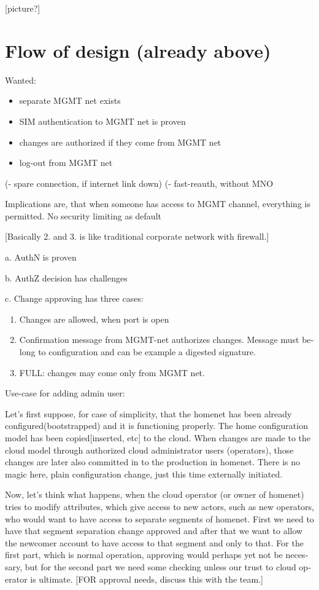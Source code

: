 \documentclass[12pt,a4paper,english]{tutthesis}
\begin{document}
\begin{otherlanguage}{english}
[picture?]

\section{Flow of design (already above)}
\label{sec-4-2}

Wanted: 
\begin{itemize}
\item separate MGMT net exists
\item SIM authentication to MGMT net is proven
\item changes are authorized if they come from MGMT net
\item log-out from MGMT net
\end{itemize}
(- spare connection, if internet link down)
(- fast-reauth, without MNO

Implications are, that when someone has access to MGMT channel,
everything is permitted. No security limiting as default 

[Basically 2. and 3. is like traditional corporate network with firewall.]

a. AuthN is proven

b. AuthZ decision has challenges

c. Change approving has three cases:
\begin{enumerate}
\item Changes are allowed, when port is open
\item Confirmation message from MGMT-net authorizes changes.
Message must belong to configuration and can be example a digested signature.
\item FULL: changes may come only from MGMT net.
\end{enumerate}


Use-case for adding admin user:

Let's first suppose, for case of simplicity, that the homenet has been
already configured(bootstrapped) and it is functioning properly.  The
home configuration model has been copied[inserted, etc] to the cloud.
When changes are made to the cloud model through authorized cloud
administrator users (operators), those changes are later also committed
in to the production in homenet. There is no magic here, plain
configuration change, just this time externally initiated.

Now, let's think what happens, when the cloud operator (or owner of
homenet) tries to modify attributes, which give access to new actors,
such as new operators, who would want to have access to separate
segments of homenet.  First we need to have that segment separation
change approved and after that we want to allow the newcomer account
to have access to that segment and only to that. For the first part,
which is normal operation, approving would perhaps yet not be
necessary, but for the second part we need some checking unless our
trust to cloud operator is ultimate.  [FOR approval needs, discuss
this with the team.]




\end{otherlanguage}
\end{document}
